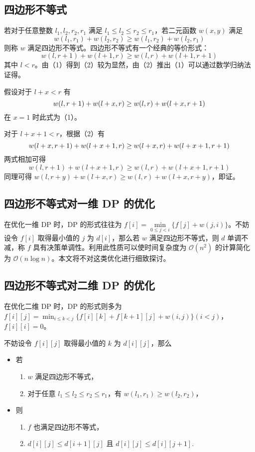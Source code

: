 \subsection{四边形不等式}

若对于任意整数 \(l_1,l_2,r_2,r_1\) 满足
\(l_1\le l_2\le r_2\le r_1\)，若二元函数 \(w(x,y)\) 满足 \[
w(l_1,r_1)+w(l_2,r_2)\ge w(l_1,r_2)+w(l_2,r_1)\tag{1}
\] 则称 \(w\) 满足四边形不等式。四边形不等式有一个经典的等价形式： \[
w(l,r+1)+w(l+1,r)\ge w(l,r)+w(l+1,r+1)\tag{2}
\] 其中
\(l\lt r\)。由（1）得到（2）较为显然，由（2）推出（1）可以通过数学归纳法证得。

假设对于 \(l+x\lt r\) 有 \[
w(l,r+1)+w(l+x,r)\ge w(l,r)+w(l+x,r+1)\\
\] 在 \(x=1\) 时此式为（1）。

对于 \(l+x+1\lt r\)，根据（2）有 \[
w(l+x,r+1)+w(l+x+1,r)\ge w(l+x,r)+w(l+x+1,r+1)\\
\] 两式相加可得 \[
w(l,r+1)+w(l+x+1,r)\ge w(l,r)+w(l+x+1,r+1)
\] 同理可得 \(w(l,r+y)+w(l+x,r)\ge w(l,r)+w(l+x,r+y)\)，即证。

\subsection{四边形不等式对一维 DP 的优化}

在优化一维 DP 时，DP 的形式往往为
\(f[i]=\min\limits_{0\le j\lt i}\{f[j]+w(j,i)\}\)。不妨设令 \(f[i]\)
取得最小值的 \(j\) 为 \(d[i]\)，那么若 \(w\) 满足四边形不等式，则 \(d\)
单调不减，称 \(f\) 具有决策单调性。利用此性质可以使时间复杂度为
\(\mathcal{O}(n^2)\) 的计算简化为
\(\mathcal{O}(n\log n)\)。本文将不对这类优化进行细致探讨。

\subsection{四边形不等式对二维 DP 的优化}

在优化二维 DP 时，DP 的形式则多为
\(f[i][j]=\min_{i\le k\lt j}\{f[i][k]+f[k+1][j]+w(i,j)\}(i\lt j)\)，\(f[i][i]=0\)。

不妨设令 \(f[i][j]\) 取得最小值的 \(k\) 为 \(d[i][j]\)，那么

\begin{itemize}
\tightlist
\item
  若

  \begin{enumerate}
  \def\labelenumi{\arabic{enumi}.}
  \tightlist
  \item
    \(w\) 满足四边形不等式，
  \item
    对于任意 \(l_1\le l_2\le r_2\le r_1\)，有
    \(w(l_1,r_1)\ge w(l_2,r_2)\)，
  \end{enumerate}
\item
  则

  \begin{enumerate}
  \def\labelenumi{\arabic{enumi}.}
  \tightlist
  \item
    \(f\) 也满足四边形不等式，
  \item
    \(d[i][j]\le d[i+1][j]\) 且 \(d[i][j]\le d[i][j+1]\).
  \end{enumerate}
\end{itemize}

